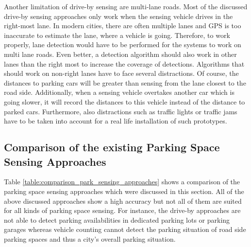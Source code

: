 Another limitation of drive-by sensing are multi-lane roads. Most of the discussed drive-by sensing approaches only work when the sensing vehicle drives in the right-most lane. In modern cities, there are often multiple lanes and GPS is too inaccurate to estimate the lane, where a vehicle is going. Therefore, to work properly, lane detection would have to be performed for the systems to work on multi lane roads. Even better, a detection algorithm should also work in other lanes than the right most to increase the coverage of detections. Algorithms that should work on non-right lanes have to face several distractions. Of course, the distances to parking cars will be greater than sensing from the lane closest to the road side. Additionally, when a sensing vehicle overtakes another car which is going slower, it will record the distances to this vehicle instead of the distance to parked cars. Furthermore, also distractions such as traffic lights or traffic jams have to be taken into account for a real life installation of such prototypes.




\subsection{Comparison of the existing Parking Space Sensing Approaches}
\label{sec:comparison_park_sensing_approaches}

Table \ref{table:comparison_park_sensing_approaches} shows a comparison of the parking space sensing approaches which were discussed in this section. All of the above discussed approaches show a high accuracy but not all of them are suited for all kinds of parking space sensing. For instance, the drive-by approaches are not able to detect parking availabilities in dedicated parking lots or parking garages whereas vehicle counting cannot detect the parking situation of road side parking spaces and thus a city's overall parking situation.


